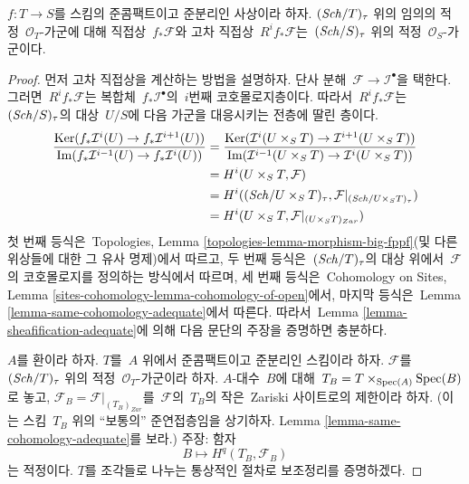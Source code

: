 \begin{lemma}
\label{lemma-direct-image-adequate}
$f : T \to S$를 스킴의 준콤팩트이고 준분리인 사상이라 하자.
$(\mathit{Sch}/T)_\tau$ 위의 임의의 적정\  $\mathcal{O}_T$-가군에 대해 직접상\ 
$f_*\mathcal{F}$와 고차 직접상\  $R^if_*\mathcal{F}$는\ 
$(\mathit{Sch}/S)_\tau$ 위의 적정\  $\mathcal{O}_S$-가군이다.
\end{lemma}

\begin{proof}
먼저 고차 직접상을 계산하는 방법을 설명하자. 단사 분해\ 
$\mathcal{F} \to \mathcal{I}^\bullet$을 택한다. 그러면\ 
$R^if_*\mathcal{F}$는 복합체\  $f_*\mathcal{I}^\bullet$의\ 
$i$번째 코호몰로지층이다. 따라서\  $R^if_*\mathcal{F}$는\ 
$(\mathit{Sch}/S)_\tau$의 대상\  $U/S$에 다음 가군을 대응시키는 전층에
딸린 층이다.
\begin{align*}
\frac{\mathop{\mathrm{Ker}}(f_*\mathcal{I}^i(U) \to f_*\mathcal{I}^{i + 1}(U))}
{\mathop{\mathrm{Im}}(f_*\mathcal{I}^{i - 1}(U) \to f_*\mathcal{I}^i(U))}
& =
\frac{\mathop{\mathrm{Ker}}(\mathcal{I}^i(U \times_S T) \to
\mathcal{I}^{i + 1}(U \times_S T))}
{\mathop{\mathrm{Im}}(\mathcal{I}^{i - 1}(U \times_S T) \to \mathcal{I}^i(U \times_S T))}
\\
& =
H^i(U \times_S T, \mathcal{F}) \\
& = H^i((\mathit{Sch}/U \times_S T)_\tau,
\mathcal{F}|_{(\mathit{Sch}/U \times_S T)_\tau}) \\
& = H^i(U \times_S T, \mathcal{F}|_{(U \times_S T)_{Zar}})
\end{align*}
첫 번째 등식은\  Topologies, Lemma
\ref{topologies-lemma-morphism-big-fppf}(및 다른 위상들에 대한
그 유사 명제)에서 따르고, 두 번째 등식은\  $(\mathit{Sch}/T)_\tau$의 대상
위에서\  $\mathcal{F}$의 코호몰로지를 정의하는 방식에서 따르며,
세 번째 등식은\  Cohomology on Sites, Lemma
\ref{sites-cohomology-lemma-cohomology-of-open}에서, 마지막 등식은\ 
Lemma \ref{lemma-same-cohomology-adequate}에서 따른다. 따라서\ 
Lemma \ref{lemma-sheafification-adequate}에 의해 다음 문단의 주장을
증명하면 충분하다.

\medskip\noindent
$A$를 환이라 하자. $T$를\  $A$ 위에서 준콤팩트이고 준분리인
스킴이라 하자. $\mathcal{F}$를\  $(\mathit{Sch}/T)_\tau$ 위의 적정\ 
$\mathcal{O}_T$-가군이라 하자. $A$-대수\  $B$에 대해\ 
$T_B = T \times_{\mathop{\mathrm{Spec}}(A)} \mathop{\mathrm{Spec}}(B)$로 놓고,
$\mathcal{F}_B = \mathcal{F}|_{(T_B)_{Zar}}$를\  $\mathcal{F}$의\ 
$T_B$의 작은\  Zariski 사이트로의 제한이라 하자. (이는 스킴\ 
$T_B$ 위의 ``보통의'' 준연접층임을 상기하자. Lemma
\ref{lemma-same-cohomology-adequate}를 보라.) 주장: 함자
$$
B \longmapsto H^q(T_B, \mathcal{F}_B)
$$
는 적정이다. $T$를 조각들로 나누는 통상적인 절차로 보조정리를
증명하겠다.


\end{proof}
